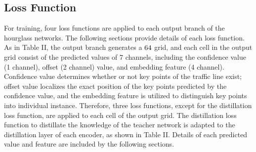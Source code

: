 \documentclass[journal]{IEEEtran}
\begin{document}
\subsection{Loss Function}
For training, four loss functions are applied to each output branch of the hourglass networks. The following sections provide details of each loss function. As in Table II, the output branch generates a $64 \time 32$ grid, and each cell in the output grid consist of the predicted values of 7 channels, including the confidence value (1 channel), offset (2 channel) value, and embedding feature (4 channel). Confidence value determines whether or not key points of the traffic line exist; offset value localizes the exact position of the key points predicted by the confidence value, and the embedding feature is utilized to distinguish key points into individual instance. Therefore, three loss functions, except for the distillation loss function, are applied to each cell of the output grid. The distillation loss function to distillate the knowledge of the teacher network is adapted to the distillation layer of each encoder, as shown in Table II. Details of each predicted value and feature are included by the following sections.
\end{document}
